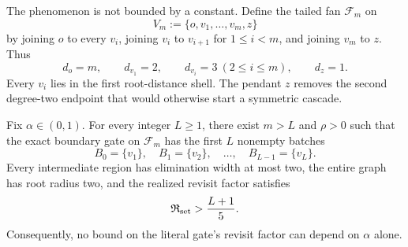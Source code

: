 The phenomenon is not bounded by a constant.  Define the tailed fan
$\mathcal F_m$ on
\begin{equation}
 V_m:=\{o,v_1,\ldots,v_m,z\}
 \label{eq:fan-vertices}
\end{equation}
by joining $o$ to every $v_i$, joining $v_i$ to $v_{i+1}$ for
$1\leq i<m$, and joining $v_m$ to $z$.  Thus
\begin{equation}
 d_o=m,\qquad d_{v_1}=2,\qquad
 d_{v_i}=3\ (2\leq i\leq m),\qquad d_z=1.
 \label{eq:fan-degrees}
\end{equation}
Every $v_i$ lies in the first root-distance shell.  The pendant $z$ removes
the second degree-two endpoint that would otherwise start a symmetric cascade.

\begin{theorem}
\label{thm:fan-cascade}
Fix $\alpha\in(0,1)$.  For every integer $L\geq1$, there exist
$m>L$ and $\rho>0$ such that the exact boundary gate on $\mathcal F_m$ has
the first $L$ nonempty batches
\begin{equation}
 B_0=\{v_1\},\quad B_1=\{v_2\},\quad\ldots,\quad
 B_{L-1}=\{v_L\}.
 \label{eq:fan-singleton-batches}
\end{equation}
Every intermediate region has elimination width at most two, the entire graph
has root radius two, and the realized revisit factor satisfies
\begin{equation}
\mathfrak R_{\rm set}>\frac{L+1}{5}.
 \label{eq:fan-revisit-lower}
\end{equation}
Consequently, no bound on the literal gate's revisit factor can depend on
$\alpha$ alone.
\end{theorem}

